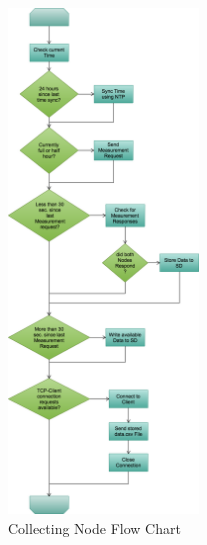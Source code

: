 \documentclass[
	11pt,
	a4paper
]{article}%
\begin{document}
\begin{figure}[h!]
  \caption{Collecting Node Flow Chart}
  \centering
    \includegraphics[width=0.45\textwidth]{../Images/collector_flow_chart.png}
\end{figure}
\end{document}
